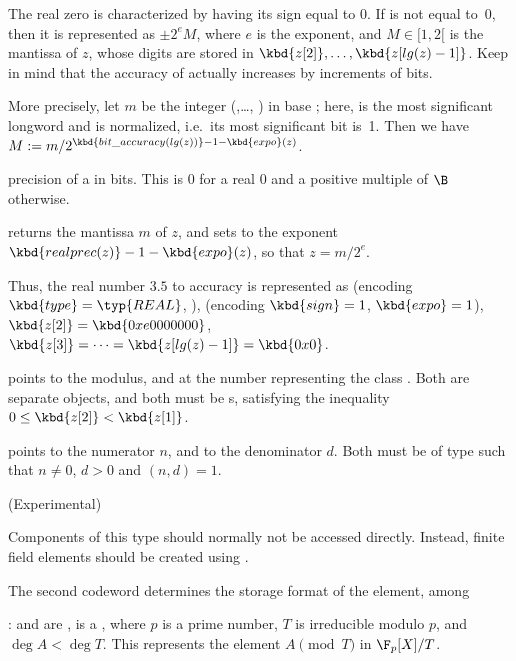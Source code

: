 The real zero is characterized by having its sign equal to 0. If  is
not equal to~0, then it is represented as $\pm 2^e M$, where $e$ is the
exponent, and $M\in [1, 2[$ is the mantissa of $z$, whose digits are stored in
$\kbd{z[2]},\dots, \kbd{z[lg(z)-1]}$. Keep in mind that the accuracy of
 actually increases by increments of \B bits.

More precisely, let $m$ be the integer (,\dots, )
in base ; here,  is the most significant
longword and is normalized, i.e.~its most significant bit is~1. Then we have
$M := m / 2^{\kbd{bit\_accuracy(lg(z))} - 1 - \kbd{expo}(z)}$.

 precision of a  in bits. This is
$0$ for a real $0$ and a positive multiple of $\B$ otherwise.

 returns the mantissa $m$ of $z$, and
sets  to the exponent $\kbd{realprec(z)}-1-\kbd{expo}(z)$, so that $z = m / 2^e$.

Thus, the real number $3.5$ to accuracy  is
represented as  (encoding $\kbd{type} = \typ{REAL}$, ),
 (encoding $\kbd{sign} = 1$, $\kbd{expo} = 1$), $\kbd{z[2]} =
\kbd{0xe0000000}$, $\kbd{z[3]} =\dots = \kbd{z[lg(z)-1]} = \kbd{0x0}$.

 points to the modulus, and  at the number representing
the class . Both are separate  objects, and both must be
s, satisfying the inequality $0 \le \kbd{z[2]} < \kbd{z[1]}$.

%
 points to the numerator $n$, and  to the denominator
$d$. Both must be of type  such that $n\neq 0$, $d > 0$ and
$(n,d) = 1$.

%
 (Experimental)

Components of this type should normally not be accessed directly. Instead,
finite field elements should be created using .

\noindent The second codeword  determines the storage format of the
element, among

\item {}:  and  are ,
 is a , where $p$ is a prime number, $T$ is irreducible
modulo $p$, and $\deg A < \deg T$.
This represents the element $A\pmod{T}$ in $\F_p[X]/T$.

